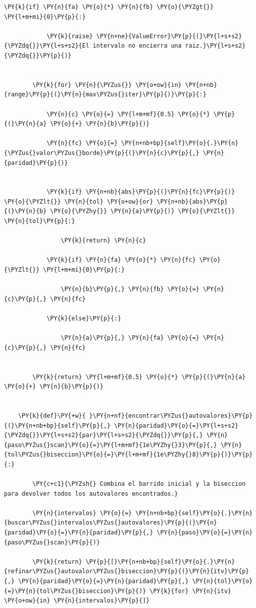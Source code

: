 \documentclass[11pt]{article}
\makeatletter
\def\PY@reset{\let\PY@it=\relax \let\PY@bf=\relax \let\PY@ul=\relax \let\PY@tc=\relax \let\PY@bc=\relax \let\PY@ff=\relax}
\def\PY@tok#1{\csname PY@tok@#1\endcsname}
\def\PY@toks#1+{\ifx\relax#1\empty\else \PY@tok{#1}\expandafter\PY@toks\fi}
\def\PY@do#1{\PY@bc{\PY@tc{\PY@ul{\PY@it{\PY@bf{\PY@ff{#1}}}}}}}
\def\PY#1#2{\PY@reset\PY@toks#1+\relax+\PY@do{#2}}
\makeatother
\begin{document}
\begin{tcolorbox}[breakable, size=fbox, boxrule=1pt, pad at break*=1mm,colback=cellbackground, colframe=cellborder]
\begin{Verbatim}[commandchars=\\\{\}]
        \PY{k}{if} \PY{n}{fa} \PY{o}{*} \PY{n}{fb} \PY{o}{\PYZgt{}} \PY{l+m+mi}{0}\PY{p}{:}

            \PY{k}{raise} \PY{n+ne}{ValueError}\PY{p}{(}\PY{l+s+s2}{\PYZdq{}}\PY{l+s+s2}{El intervalo no encierra una raiz.}\PY{l+s+s2}{\PYZdq{}}\PY{p}{)}


        \PY{k}{for} \PY{n}{\PYZus{}} \PY{o+ow}{in} \PY{n+nb}{range}\PY{p}{(}\PY{n}{max\PYZus{}iter}\PY{p}{)}\PY{p}{:}

            \PY{n}{c} \PY{o}{=} \PY{l+m+mf}{0.5} \PY{o}{*} \PY{p}{(}\PY{n}{a} \PY{o}{+} \PY{n}{b}\PY{p}{)}

            \PY{n}{fc} \PY{o}{=} \PY{n+nb+bp}{self}\PY{o}{.}\PY{n}{\PYZus{}valor\PYZus{}borde}\PY{p}{(}\PY{n}{c}\PY{p}{,} \PY{n}{paridad}\PY{p}{)}


            \PY{k}{if} \PY{n+nb}{abs}\PY{p}{(}\PY{n}{fc}\PY{p}{)} \PY{o}{\PYZlt{}} \PY{n}{tol} \PY{o+ow}{or} \PY{n+nb}{abs}\PY{p}{(}\PY{n}{b} \PY{o}{\PYZhy{}} \PY{n}{a}\PY{p}{)} \PY{o}{\PYZlt{}} \PY{n}{tol}\PY{p}{:}

                \PY{k}{return} \PY{n}{c}

            \PY{k}{if} \PY{n}{fa} \PY{o}{*} \PY{n}{fc} \PY{o}{\PYZlt{}} \PY{l+m+mi}{0}\PY{p}{:}

                \PY{n}{b}\PY{p}{,} \PY{n}{fb} \PY{o}{=} \PY{n}{c}\PY{p}{,} \PY{n}{fc}

            \PY{k}{else}\PY{p}{:}

                \PY{n}{a}\PY{p}{,} \PY{n}{fa} \PY{o}{=} \PY{n}{c}\PY{p}{,} \PY{n}{fc}


        \PY{k}{return} \PY{l+m+mf}{0.5} \PY{o}{*} \PY{p}{(}\PY{n}{a} \PY{o}{+} \PY{n}{b}\PY{p}{)}


    \PY{k}{def}\PY{+w}{ }\PY{n+nf}{encontrar\PYZus{}autovalores}\PY{p}{(}\PY{n+nb+bp}{self}\PY{p}{,} \PY{n}{paridad}\PY{o}{=}\PY{l+s+s2}{\PYZdq{}}\PY{l+s+s2}{par}\PY{l+s+s2}{\PYZdq{}}\PY{p}{,} \PY{n}{paso\PYZus{}scan}\PY{o}{=}\PY{l+m+mf}{1e\PYZhy{}3}\PY{p}{,} \PY{n}{tol\PYZus{}biseccion}\PY{o}{=}\PY{l+m+mf}{1e\PYZhy{}8}\PY{p}{)}\PY{p}{:}

        \PY{c+c1}{\PYZsh{} Combina el barrido inicial y la biseccion para devolver todos los autovalores encontrados.}

        \PY{n}{intervalos} \PY{o}{=} \PY{n+nb+bp}{self}\PY{o}{.}\PY{n}{buscar\PYZus{}intervalos\PYZus{}autovalores}\PY{p}{(}\PY{n}{paridad}\PY{o}{=}\PY{n}{paridad}\PY{p}{,} \PY{n}{paso}\PY{o}{=}\PY{n}{paso\PYZus{}scan}\PY{p}{)}

        \PY{k}{return} \PY{p}{[}\PY{n+nb+bp}{self}\PY{o}{.}\PY{n}{refinar\PYZus{}autovalor\PYZus{}biseccion}\PY{p}{(}\PY{n}{itv}\PY{p}{,} \PY{n}{paridad}\PY{o}{=}\PY{n}{paridad}\PY{p}{,} \PY{n}{tol}\PY{o}{=}\PY{n}{tol\PYZus{}biseccion}\PY{p}{)} \PY{k}{for} \PY{n}{itv} \PY{o+ow}{in} \PY{n}{intervalos}\PY{p}{]}



\end{Verbatim}
\end{tcolorbox}
\end{document}
